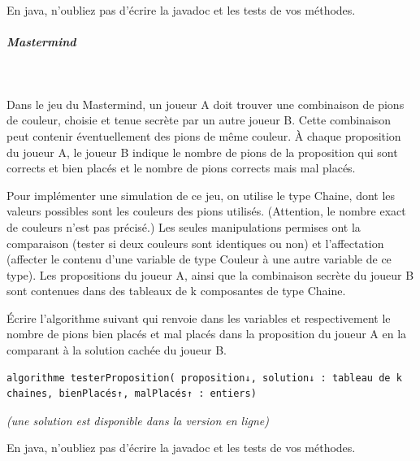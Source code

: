 \documentclass[11pt,a4paper]{article}
\begin{document}
            \par
        En java, n'oubliez pas d'\'ecrire la javadoc et les tests de vos m\'ethodes.
            \par
        
			
		\subparagraph{Mastermind} 
		
					\textcolor{white}{.} \par
				
          Dans le jeu du Mastermind, un joueur A doit trouver une combinaison de 
          \verb@k@ pions de couleur,
          choisie et tenue secr\`ete par un autre joueur B. Cette combinaison peut contenir \'eventuellement 
          des pions de m\^eme couleur. \`A chaque proposition du joueur A, le joueur B indique
          le nombre de pions de la proposition qui sont corrects et bien plac\'es et le nombre de pions
          corrects mais mal plac\'es.
        
            \par
        
          Pour impl\'ementer une simulation de ce jeu, on utilise le type Chaine, dont les valeurs
          possibles sont les couleurs des pions utilis\'es. (Attention, le nombre exact de couleurs n'est
          pas pr\'ecis\'e.) Les seules manipulations permises ont la comparaison (tester si
          deux couleurs sont identiques ou non) et l'affectation (affecter le contenu d'une variable de
          type Couleur \`a une autre variable de ce type). Les propositions du joueur A, ainsi que la
          combinaison secr\`ete du joueur B sont contenues dans des tableaux de k composantes de type
          Chaine.
        
            \par
        
          \'Ecrire l'algorithme suivant qui renvoie dans les variables  
          et  respectivement
          le nombre de pions bien plac\'es et mal plac\'es dans la \guillemotleft  proposition \guillemotright  du joueur A en la
          comparant \`a la \guillemotleft  solution \guillemotright  cach\'ee du joueur B.
        
            \par
        \begin{verbatim}
algorithme testerProposition( proposition↓, solution↓ : tableau de k chaines, bienPlacés↑, malPlacés↑ : entiers)
        \end{verbatim} {\footnotesize\emph{(une solution est disponible dans la version en ligne)}\par} En java, n'oubliez pas d'\'ecrire la javadoc et les tests de vos m\'ethodes.
            \par
        
				
\end{document}
